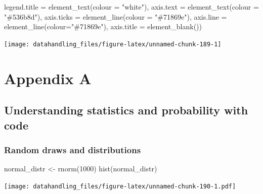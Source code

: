 \documentclass[
  12pt,
]{style/krantz}
\newenvironment{Shaded}{\begin{snugshade}}{\end{snugshade}}
\newcommand{\AttributeTok}[1]{\textcolor[rgb]{0.77,0.63,0.00}{#1}}
\newcommand{\DecValTok}[1]{\textcolor[rgb]{0.00,0.00,0.81}{#1}}
\newcommand{\FunctionTok}[1]{\textcolor[rgb]{0.00,0.00,0.00}{#1}}
\newcommand{\NormalTok}[1]{#1}
\newcommand{\OtherTok}[1]{\textcolor[rgb]{0.56,0.35,0.01}{#1}}
\newcommand{\StringTok}[1]{\textcolor[rgb]{0.31,0.60,0.02}{#1}}
\begin{document}
\begin{Shaded}
\begin{Highlighting}[]
        \AttributeTok{legend.title =} \FunctionTok{element\_text}\NormalTok{(}\AttributeTok{colour =} \StringTok{"white"}\NormalTok{),}
        \AttributeTok{axis.text =} \FunctionTok{element\_text}\NormalTok{(}\AttributeTok{colour =} \StringTok{"\#536b8d"}\NormalTok{),}
        \AttributeTok{axis.ticks =} \FunctionTok{element\_line}\NormalTok{(}\AttributeTok{colour =} \StringTok{"\#71869e"}\NormalTok{),}
        \AttributeTok{axis.line =} \FunctionTok{element\_line}\NormalTok{(}\AttributeTok{colour=}\StringTok{"\#71869e"}\NormalTok{),}
        \AttributeTok{axis.title =} \FunctionTok{element\_blank}\NormalTok{())}
\end{Highlighting}
\end{Shaded}

\texttt{[image: datahandling\_files/figure-latex/unnamed-chunk-189-1]}

\backmatter

\hypertarget{appendix-appendix}{%
\appendix {}}


\hypertarget{appendix-a}{%
\chapter{Appendix A}\label{appendix-a}}

\hypertarget{understanding-statistics-and-probability-with-code}{%
\section{Understanding statistics and probability with code}\label{understanding-statistics-and-probability-with-code}}

\hypertarget{random-draws-and-distributions}{%
\subsection{Random draws and distributions}\label{random-draws-and-distributions}}

\begin{Shaded}
\begin{Highlighting}[]
\NormalTok{normal\_distr }\OtherTok{\textless{}{-}} \FunctionTok{rnorm}\NormalTok{(}\DecValTok{1000}\NormalTok{)}
\FunctionTok{hist}\NormalTok{(normal\_distr)}
\end{Highlighting}
\end{Shaded}

\texttt{[image: datahandling\_files/figure-latex/unnamed-chunk-190-1.pdf]}
\end{document}
